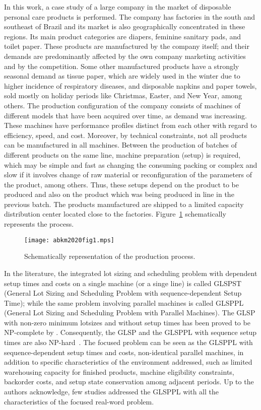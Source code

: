\documentclass[11pt]{article}
\begin{document}
In this work, a case study of a large company in the market of disposable personal care products is performed. The company has factories in the south and southeast of Brazil and its market is also geographically concentrated in these regions. Its main product categories are diapers, feminine sanitary pads, and toilet paper. These products are manufactured by the company itself; and their demands are predominantly affected by the own company marketing activities and by the competition. Some other manufactured products have a strongly seasonal demand as tissue paper, which are widely used in the winter due to higher incidence of respiratory diseases, and disposable napkins and paper towels, sold mostly on holiday periods like Christmas, Easter, and New Year, among others. The production configuration of the company consists of machines of different models that have been acquired over time, as demand was increasing. These machines have performance profiles distinct from each other with regard to efficiency, speed, and cost. Moreover,  by technical constraints,  not all products can be manufactured in all machines. Between the production of batches of different products on the same line, machine preparation (setup) is required, which may be simple and fast as changing the consuming packing or complex and slow if it involves change of raw material or reconfiguration of the parameters of the product, among others. Thus, these setups depend on the product to be produced and also on the product which was being produced in line in the previous batch. The products manufactured are shipped to a limited capacity distribution center located close to the factories. Figure~\ref{fig1} schematically represents the process.

\begin{figure}[!ht]
\centering
\texttt{[image: abkm2020fig1.mps]}
\caption{Schematically representation of the production process.}
\label{fig1}
\end{figure}

In the literature, the integrated lot sizing and scheduling problem with dependent setup times and costs on a single machine (or a singe line) is called GLSPST (General Lot Sizing and Scheduling Problem with sequence-dependent Setup Time); while the same problem involving parallel machines is called GLSPPL (General Lot Sizing and Scheduling Problem with Parallel Machines). The GLSP with non-zero minimum lotsizes and without setup times has been proved to be NP-complete by \cite{fleischmann1997general}. Consequently, the GLSP and the GLSPPL with sequence setup times are also NP-hard~\citep{meyr2000simultaneous,meyr2002simultaneous}. 
The focused problem  can be seen as the GLSPPL with sequence-dependent setup times and costs, non-identical parallel machines, in addition to specific characteristics of the environment addressed, such as limited warehousing capacity for finished products, machine eligibility constraints,  backorder costs, and setup state conservation among adjacent periods. Up to the authors acknowledge, few studies addressed the GLSPPL with all the characteristics of the focused real-word problem.
\end{document}

